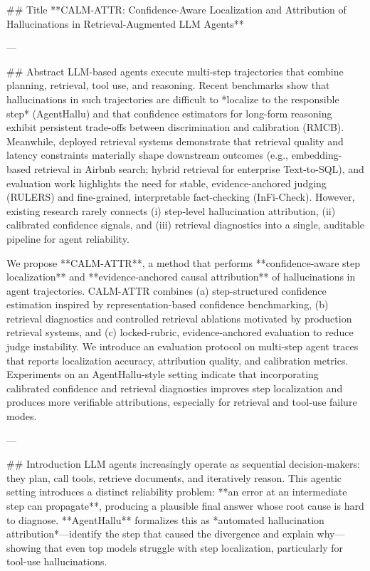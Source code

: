 ## Title  
**CALM-ATTR: Confidence-Aware Localization and Attribution of Hallucinations in Retrieval-Augmented LLM Agents**

---

## Abstract  
LLM-based agents execute multi-step trajectories that combine planning, retrieval, tool use, and reasoning. Recent benchmarks show that hallucinations in such trajectories are difficult to *localize to the responsible step* (AgentHallu) and that confidence estimators for long-form reasoning exhibit persistent trade-offs between discrimination and calibration (RMCB). Meanwhile, deployed retrieval systems demonstrate that retrieval quality and latency constraints materially shape downstream outcomes (e.g., embedding-based retrieval in Airbnb search; hybrid retrieval for enterprise Text-to-SQL), and evaluation work highlights the need for stable, evidence-anchored judging (RULERS) and fine-grained, interpretable fact-checking (InFi-Check). However, existing research rarely connects (i) step-level hallucination attribution, (ii) calibrated confidence signals, and (iii) retrieval diagnostics into a single, auditable pipeline for agent reliability.

We propose **CALM-ATTR**, a method that performs **confidence-aware step localization** and **evidence-anchored causal attribution** of hallucinations in agent trajectories. CALM-ATTR combines (a) step-structured confidence estimation inspired by representation-based confidence benchmarking, (b) retrieval diagnostics and controlled retrieval ablations motivated by production retrieval systems, and (c) locked-rubric, evidence-anchored evaluation to reduce judge instability. We introduce an evaluation protocol on multi-step agent traces that reports localization accuracy, attribution quality, and calibration metrics. Experiments on an AgentHallu-style setting indicate that incorporating calibrated confidence and retrieval diagnostics improves step localization and produces more verifiable attributions, especially for retrieval and tool-use failure modes.

---

## Introduction  
LLM agents increasingly operate as sequential decision-makers: they plan, call tools, retrieve documents, and iteratively reason. This agentic setting introduces a distinct reliability problem: **an error at an intermediate step can propagate**, producing a plausible final answer whose root cause is hard to diagnose. **AgentHallu** formalizes this as *automated hallucination attribution*—identify the step that caused the divergence and explain why—showing that even top models struggle with step localization, particularly for tool-use hallucinations.

